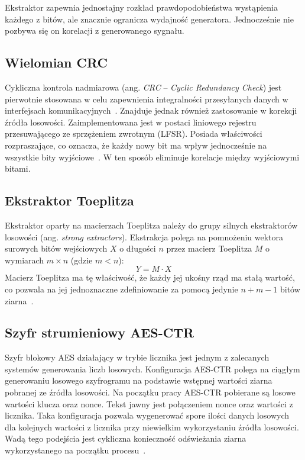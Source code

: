 Ekstraktor zapewnia jednostajny rozkład prawdopodobieństwa wystąpienia 
każdego z bitów, ale znacznie ogranicza wydajność generatora. Jednocześnie 
nie pozbywa się on korelacji z generowanego sygnału. 

\subsection{Wielomian CRC}

\noindent Cykliczna kontrola nadmiarowa (ang. \textit{CRC} -- \textit{Cyclic Redundancy Check}) jest 
pierwotnie stosowana w celu zapewnienia integralności przesyłanych danych w 
interfejsach komunikacyjnych~\cite{ucgosu-CRC}. Znajduje jednak również 
zastosowanie w korekcji źródła losowości. 
Zaimplementowana jest w postaci liniowego rejestru przesuwającego ze 
sprzężeniem zwrotnym (LFSR). Posiada właściwości rozpraszające, co oznacza, że każdy nowy 
bit ma wpływ jednocześnie na wszystkie bity wyjściowe~\cite{neoTRNG}. W ten sposób eliminuje 
korelacje między wyjściowymi bitami.


\subsection{Ekstraktor Toeplitza}

\noindent Ekstraktor oparty na macierzach Toeplitza należy do grupy silnych 
ekstraktorów losowości (ang. \emph{strong extractors}). Ekstrakcja polega na 
pomnożeniu wektora surowych bitów wejściowych $X$ o długości $n$ przez macierz 
Toeplitza $M$ o wymiarach $m \times n$ (gdzie $m < n$):
\begin{equation}
    Y = M \cdot X
\end{equation}
Macierz Toeplitza ma tę właściwość, że każdy jej ukośny rząd ma stałą wartość, 
co pozwala na jej jednoznaczne zdefiniowanie za pomocą jedynie $n + m - 1$ 
bitów ziarna~\cite{ch2-Toeplitz}.

\subsection{Szyfr strumieniowy AES-CTR}

\noindent Szyfr blokowy AES działający w trybie licznika jest jednym z zalecanych 
systemów generowania liczb losowych. Konfiguracja AES-CTR polega na ciągłym generowaniu 
losowego szyfrogramu na podstawie wstępnej wartości ziarna pobranej ze źródła 
losowości. 
Na początku pracy AES-CTR pobierane są losowe wartości klucza oraz nonce. Tekst jawny jest 
połączeniem nonce oraz wartości z licznika. Taka konfiguracja pozwala 
wygenerować spore ilości danych losowych dla kolejnych wartości z licznika 
przy niewielkim wykorzystaniu źródła losowości. 
Wadą tego podejścia jest cykliczna konieczność odświeżania ziarna wykorzystanego 
na początku procesu~\cite{NIST-IR-6390}.  

